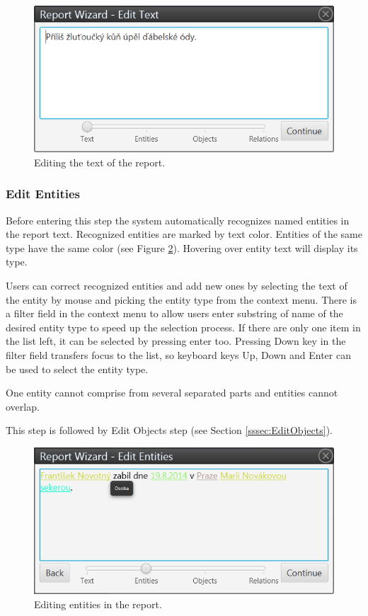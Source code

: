 \begin{figure}[!htb]
        \centering
        \includegraphics[width=\textwidth]{Images/reportedit}
        \caption{Editing the text of the report.}
        \label{fig:ReportEdit}
\end{figure}

\subsubsection{Edit Entities}
\label{sssec:EditEntities}

Before entering this step the system automatically recognizes named entities
in the report text. Recognized entities are marked by text color. Entities of
the same type have the same color (see Figure \ref{fig:Entities}). Hovering over
entity text will display its type.

Users can correct recognized entities and add new ones by selecting the text
of the entity by mouse and picking the entity type from the context menu.
There is a filter field in the context menu to allow users enter substring of
name of the desired entity type to speed up the selection process. If there are
only one item in the list left, it can be selected by pressing enter too.
Pressing Down key in the filter field transfers focus to the list, so keyboard
keys Up, Down and Enter can be used to select the entity type.

One entity cannot comprise from several separated parts and entities cannot
overlap.

This step is followed by Edit Objects step (see Section
\ref{sssec:EditObjects}).

\begin{figure}[!htb]
        \centering
        \includegraphics[width=\textwidth]{Images/entities}
        \caption{Editing entities in the report.}
        \label{fig:Entities}
\end{figure}

